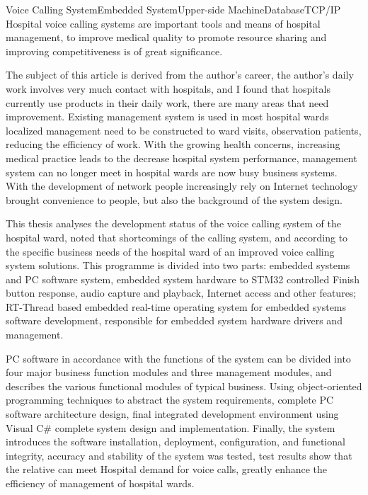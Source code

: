 
\begin{Eabstract}{Voice Calling System}{Embedded System}{Upper-side Machine}{Database}{TCP/IP}
Hospital voice calling systems are important tools and means of hospital management, to improve medical quality to promote resource sharing and improving competitiveness is of great significance.

The subject of this article is derived from the author's career, the author's daily work involves very much contact with hospitals, and I found that hospitals currently use products in their daily work, there are many areas that need improvement. Existing management system is used in most hospital wards localized management need to be constructed to ward visits, observation patients, reducing the efficiency of work. With the growing health concerns, increasing medical practice leads to the decrease hospital system performance, management system can no longer meet in hospital wards are now busy business systems. With the development of network people increasingly rely on Internet technology brought convenience to people, but also the background of the system design.

This thesis analyses the development status of the voice calling system of the hospital ward, noted that shortcomings of the calling system, and according to the specific business needs of the hospital ward of an improved voice calling system solutions. This programme is divided into two parts: embedded systems and PC software system, embedded system hardware to STM32 controlled Finish button response, audio capture and playback, Internet access and other features; RT-Thread based embedded real-time operating system for embedded systems software development, responsible for embedded system hardware drivers and management.

PC software in accordance with the functions of the system can be divided into four major business function modules and three management modules, and describes the various functional modules of typical business. Using object-oriented programming techniques to abstract the system requirements, complete PC software architecture design, final integrated development environment using Visual C{\#} complete system design and implementation. Finally, the system introduces the software installation, deployment, configuration, and functional integrity, accuracy and stability of the system was tested, test results show that the relative can meet Hospital demand for voice calls, greatly enhance the efficiency of management of hospital wards.
\end{Eabstract}
